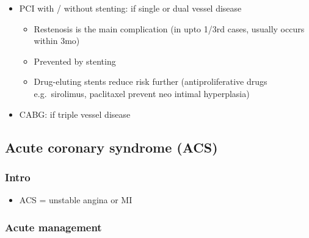 \documentclass[
  12pt,
]{memoir}
\providecommand{\tightlist}{%
  \setlength{\itemsep}{0pt}\setlength{\parskip}{0pt}}
\begin{document}
\begin{itemize}
  \begin{itemize}
  \tightlist
  \item
    PCI with / without stenting: if single or dual vessel disease

    \begin{itemize}
    \tightlist
    \item
      Restenosis is the main complication (in upto 1/3rd cases, usually
      occurs within 3mo)
    \item
      Prevented by stenting
    \item
      Drug-eluting stents reduce risk further (antiproliferative drugs
      e.g.~sirolimus, paclitaxel prevent neo intimal hyperplasia)
    \end{itemize}
  \item
    CABG: if triple vessel disease
  \end{itemize}
\end{itemize}

\hypertarget{acute-coronary-syndrome-acs}{%
\subsection{Acute coronary syndrome
(ACS)}\label{acute-coronary-syndrome-acs}}

\hypertarget{intro-3}{%
\subsubsection{Intro}\label{intro-3}}

\begin{itemize}
\tightlist
\item
  ACS = unstable angina or MI
\end{itemize}

\hypertarget{acute-management}{%
\subsubsection{Acute management}\label{acute-management}}
\end{document}
